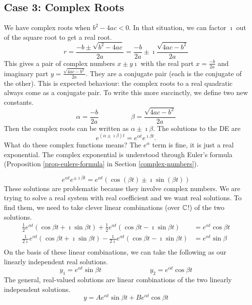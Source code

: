 \documentclass[fleqn,letterpaper]{report}
\begin{document}
\subsection{Case 3: Complex Roots}
\label{complex-roots}

We have complex roots when $b^2 - 4ac<0$. In that situation,
we can factor $\imath$ out of the square root to get a real
root. 
\begin{equation*}
r = \frac{-b \pm \sqrt{b^2-4ac}}{2a} = \frac{-b}{2a} \pm \imath
\frac{\sqrt{4ac-b^2}}{2a} 
\end{equation*}
This gives a pair of complex numbers $x \pm y \imath$ with the
real part $x = \frac{-b}{2a}$ and imaginary part $y = \frac{
\sqrt{4ac-b^2}}{2a}$. They are a conjugate pair (each is the
conjugate of the other). This is expected behaviour: the
complex roots to a real quadratic always come as a conjugate
pair. To write this more succinctly, we define two new constants.
\begin{equation*}
\alpha = \frac{-b}{2a} \hspace{2cm} \beta =
\frac{\sqrt{4ac-b^2}}{2a}
\end{equation*}
Then the complex roots can be written as $\alpha \pm \imath
\beta$. The solutions to the DE are
\begin{equation*}
e^{(\alpha \pm \imath \beta)t} = e^{\alpha t} e^{\imath \beta
t}.
\end{equation*}
What do these complex functions means? The $e^{\alpha}$ term is fine,
it is just a real exponential. The complex exponential
is understood through Euler's formula (Proposition
\ref{prop-eulers-formula} in Section \ref{complex-numbers}). 

\begin{equation*}
e^{\alpha t} e^{\pm \imath \beta t} = e^{\alpha t} ( \cos
(\beta t) \pm \imath \sin (\beta t))
\end{equation*}
These solutions are problematic because they involve complex
numbers. We are trying to solve a real system with real
coefficient and we want real solutions. To find them, we need
to take clever linear combinations (over $\mathbb{C}$!) of the two
solutions.
\begin{align*}
\frac{1}{2} e^{\alpha t}(\cos \beta t + \imath \sin \beta t) + 
\frac{1}{2} e^{\alpha t}(\cos \beta t - \imath \sin \beta t) & =
e^{\alpha t} \cos \beta t \\
\frac{1}{2\imath } e^{\alpha t}(\cos \beta t + \imath \sin \beta t) - 
\frac{1}{2\imath} e^{\alpha t}(\cos \beta t - \imath \sin \beta
t) & = e^{\alpha t} \sin \beta \\
\end{align*}
On the basis of these linear combinations, we can take the
following as our linearly independent real solutions.
\begin{equation*}
y_1 = e^{\alpha t} \sin \beta t \hspace{3cm} y_2 = e^{\alpha
t} \cos \beta t
\end{equation*}
The general, real-valued solutions are linear combinations of
the two linearly independent solutions.
\begin{equation*}
y = A e^{\alpha t} \sin \beta t + B e^{\alpha t} \cos \beta t
\end{equation*}
\end{document}
